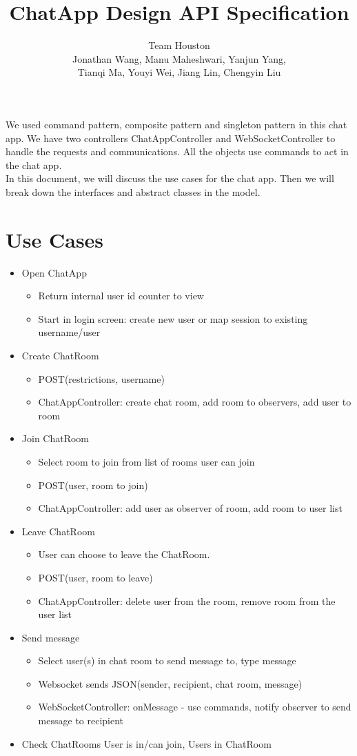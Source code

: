\documentclass[letterpaper, 11pt]{article}
\title{ChatApp Design API Specification}
\author{Team Houston\\ Jonathan Wang, Manu Maheshwari, Yanjun Yang,\\ Tianqi Ma, Youyi Wei, Jiang Lin, Chengyin Liu}
\date{}
\begin{document}
\maketitle

We used command pattern, composite pattern and singleton pattern in this chat app. We have two controllers ChatAppController and WebSocketController to handle the requests and communications. All the objects use commands to act in the chat app.\\

In this document, we will discuss the use cases for the chat app. Then we will break down the interfaces and abstract classes in the model. 

\section{Use Cases}
\begin{itemize}
\item Open ChatApp
\begin{itemize}
\item Return internal user id counter to view
\item Start in login screen: create new user or map session to existing username/user
\end{itemize}
\item Create ChatRoom
\begin{itemize}
\item POST(restrictions, username)
\item ChatAppController: create chat room, add room to observers, add user to room
\end{itemize}
\item Join ChatRoom
\begin{itemize}
\item Select room to join from list of rooms user can join
\item POST(user, room to join) 
\item ChatAppController: add user as observer of room, add room to user list
\end{itemize}
\item Leave ChatRoom
\begin{itemize}
\item User can choose to leave the ChatRoom.
\item POST(user, room to leave)
\item ChatAppController: delete user from the room, remove room from the user list
\end{itemize}
\item Send message
\begin{itemize}
\item Select user(s) in chat room to send message to, type message
\item Websocket sends JSON(sender, recipient, chat room, message)
\item WebSocketController: onMessage - use commands, notify observer to send message to recipient
\end{itemize}
\item Check ChatRooms User is in/can join, Users in ChatRoom
\end{itemize}
\end{document}
